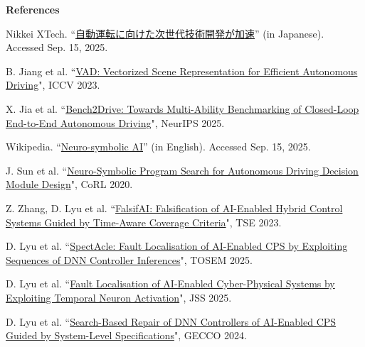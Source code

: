 \documentclass[11pt,a4paper]{moderncv}        %
\begin{document}
\vspace{6em} %

{\footnotesize
\textbf{References} 
\begin{enumerate} [label={[\arabic*]}, leftmargin=*] 
  \item \hypertarget{paper1}{}Nikkei XTech. ``\href{https://xtech.nikkei.com/atcl/nxt/column/18/03080/012300002/}{自動運転に向けた次世代技術開発が加速}'' (in Japanese). Accessed Sep. 15, 2025.
  \item \hypertarget{paper2}{}B. Jiang et al. ``\href{https://openaccess.thecvf.com/content/ICCV2023/html/Jiang_VAD_Vectorized_Scene_Representation_for_Efficient_Autonomous_Driving_ICCV_2023_paper.html}{VAD: Vectorized Scene Representation for Efficient Autonomous Driving}", ICCV 2023.
  \item \hypertarget{paper3}{}X. Jia et al. ``\href{https://dl.acm.org/doi/10.5555/3737916.3737941}{Bench2Drive: Towards Multi-Ability Benchmarking of Closed-Loop End-to-End Autonomous Driving}", NeurIPS 2025.
  \item Wikipedia. \hypertarget{paper4}{}``\href{https://en.wikipedia.org/wiki/Neuro-symbolic_AI}{Neuro-symbolic AI}'' (in English). Accessed Sep. 15, 2025.
  \item J. Sun et al. \hypertarget{paper5}{}``\href{https://proceedings.mlr.press/v155/sun21a.html}{Neuro-Symbolic Program Search for Autonomous Driving Decision Module Design}", CoRL 2020. 
  \item Z. Zhang, D. Lyu et al. \hypertarget{paper6}{}``\href{https://ieeexplore.ieee.org/document/9844247}{FalsifAI: Falsification of AI-Enabled Hybrid Control Systems Guided by Time-Aware Coverage Criteria}", TSE 2023.
  \item \hypertarget{paper7}{}D. Lyu et al. ``\href{https://dl.acm.org/doi/10.1145/3705307}{SpectAcle: Fault Localisation of AI-Enabled CPS by Exploiting Sequences of DNN Controller Inferences}", TOSEM 2025.
  \item \hypertarget{paper8}{}D. Lyu et al. ``\href{https://www.sciencedirect.com/science/article/abs/pii/S0164121225001438}{Fault Localisation of AI-Enabled Cyber-Physical Systems by Exploiting Temporal Neuron Activation}", JSS 2025.
  \item \hypertarget{paper9}{}D. Lyu et al. ``\href{https://dl.acm.org/doi/10.1145/3638529.3654078}{Search-Based Repair of DNN Controllers of AI-Enabled CPS Guided by System-Level Specifications}", GECCO 2024.
 \end{enumerate}
}
\end{document}
